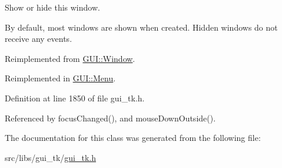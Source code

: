 Show or hide this window. 

By default, most windows are shown when created. Hidden windows do not receive any events. 

Reimplemented from \hyperlink{classGUI_1_1Window_a7cd474e3c89ff37a4295da00f3624cc7}{G\-U\-I\-::\-Window}.



Reimplemented in \hyperlink{classGUI_1_1Menu_aa98bb7305b74088dd875ead6747cfa52}{G\-U\-I\-::\-Menu}.



Definition at line 1850 of file gui\-\_\-tk.\-h.



Referenced by focus\-Changed(), and mouse\-Down\-Outside().



The documentation for this class was generated from the following file\-:\begin{DoxyCompactItemize}
\item 
src/libs/gui\-\_\-tk/\hyperlink{gui__tk_8h}{gui\-\_\-tk.\-h}\end{DoxyCompactItemize}
